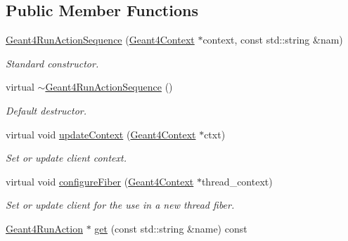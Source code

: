 \subsection*{Public Member Functions}
\begin{DoxyCompactItemize}
\item 
\hyperlink{class_d_d4hep_1_1_simulation_1_1_geant4_run_action_sequence_a91f1971562561332f1a41e8e3492e602}{Geant4RunActionSequence} (\hyperlink{class_d_d4hep_1_1_simulation_1_1_geant4_context}{Geant4Context} $\ast$context, const std::string \&nam)
\begin{DoxyCompactList}\small\item\em Standard constructor. \item\end{DoxyCompactList}\item 
virtual \hyperlink{class_d_d4hep_1_1_simulation_1_1_geant4_run_action_sequence_a4489dd79f6a419c4788a73efd50f6024}{$\sim$Geant4RunActionSequence} ()
\begin{DoxyCompactList}\small\item\em Default destructor. \item\end{DoxyCompactList}\item 
virtual void \hyperlink{class_d_d4hep_1_1_simulation_1_1_geant4_run_action_sequence_ad94eee6a819a88302a0eaa0874d88fa3}{updateContext} (\hyperlink{class_d_d4hep_1_1_simulation_1_1_geant4_context}{Geant4Context} $\ast$ctxt)
\begin{DoxyCompactList}\small\item\em Set or update client context. \item\end{DoxyCompactList}\item 
virtual void \hyperlink{class_d_d4hep_1_1_simulation_1_1_geant4_run_action_sequence_adf657c521620857ffed702783c0a2712}{configureFiber} (\hyperlink{class_d_d4hep_1_1_simulation_1_1_geant4_context}{Geant4Context} $\ast$thread\_\-context)
\begin{DoxyCompactList}\small\item\em Set or update client for the use in a new thread fiber. \item\end{DoxyCompactList}\item 
\hyperlink{class_d_d4hep_1_1_simulation_1_1_geant4_run_action}{Geant4RunAction} $\ast$ \hyperlink{class_d_d4hep_1_1_simulation_1_1_geant4_run_action_sequence_a8ebffd1974870b7e167f580610c9aa72}{get} (const std::string \&name) const 

\end{DoxyCompactItemize}
